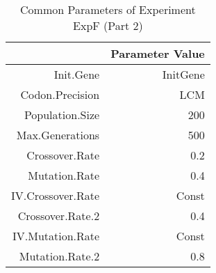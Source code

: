 \begin{table}[ht]
\centering
\begin{tabular}{rr}
  \hline
 & Parameter Value \\ 
  \hline
Init.Gene & InitGene \\ 
  Codon.Precision & LCM \\ 
  Population.Size & 200 \\ 
  Max.Generations & 500 \\ 
  Crossover.Rate & 0.2 \\ 
  Mutation.Rate & 0.4 \\ 
  IV.Crossover.Rate & Const \\ 
  Crossover.Rate.2 & 0.4 \\ 
  IV.Mutation.Rate & Const \\ 
  Mutation.Rate.2 & 0.8 \\ 
   \hline
\end{tabular}
\caption{Common Parameters of Experiment ExpF (Part 2)} 
\end{table}
